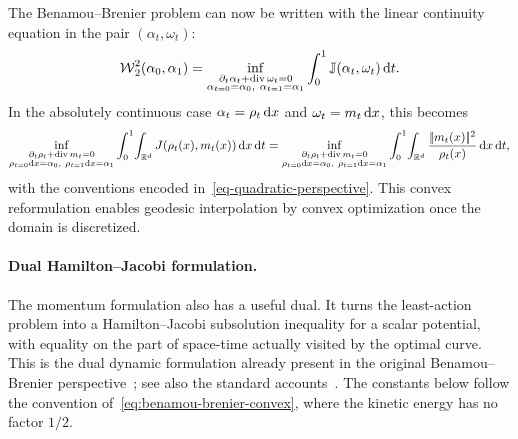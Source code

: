 The Benamou--Brenier problem can now be written with the linear continuity equation in the pair \((\alpha_t,\omega_t)\):
\begin{equation}\label{eq:benamou-brenier-convex}
	\operatorname{\mathcal{W}}_2^2(\alpha_0,\alpha_1)
	=
	\inf_{\substack{\partial_t\alpha_t+\operatorname{div} \omega_t=0\\
	\alpha_{t=0}=\alpha_0,\ \alpha_{t=1}=\alpha_1}}
	\int_0^1 \mathbb J(\alpha_t,\omega_t)\,\mathrm{d} t.
\end{equation}
In the absolutely continuous case \(\alpha_t=\rho_t\,\mathrm{d} x\) and \(\omega_t=m_t\,\mathrm{d} x\), this becomes
\[
	\inf_{\substack{\partial_t\rho_t+\operatorname{div} m_t=0\\
	\rho_{t=0}\mathrm{d} x=\alpha_0,\ \rho_{t=1}\mathrm{d} x=\alpha_1}}
	\int_0^1\!\int_{\mathbb{R}^d}
	J(\rho_t(x),m_t(x))\,\mathrm{d} x\,\mathrm{d} t
	=
	\inf_{\substack{\partial_t\rho_t+\operatorname{div} m_t=0\\
	\rho_{t=0}\mathrm{d} x=\alpha_0,\ \rho_{t=1}\mathrm{d} x=\alpha_1}}
	\int_0^1\!\int_{\mathbb{R}^d}
	\frac{|\!| m_t(x) |\!|^2}{\rho_t(x)}\,\mathrm{d} x\,\mathrm{d} t,
\]
with the conventions encoded in~\eqref{eq-quadratic-perspective}. This convex reformulation enables geodesic interpolation by convex optimization once the domain is discretized.

\paragraph{Dual Hamilton--Jacobi formulation.}

The momentum formulation also has a useful dual. It turns the least-action problem into a Hamilton--Jacobi subsolution inequality for a scalar potential, with equality on the part of space-time actually visited by the optimal curve. This is the dual dynamic formulation already present in the original Benamou--Brenier perspective~\cite{benamou2000computational}; see also the standard accounts~\cite{Villani03,SantambrogioBook}. The constants below follow the convention of~\eqref{eq:benamou-brenier-convex}, where the kinetic energy has no factor $1/2$.


